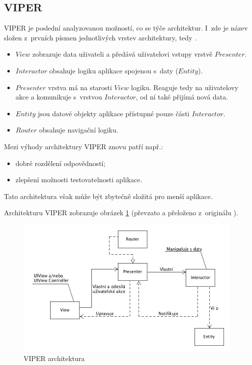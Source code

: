 \documentclass[thesis=M,czech]{FITthesis}[2012/06/26]
\begin{document}
\subsection{VIPER}
VIPER je poslední analyzovanou možností, co se týče architektur. I~zde je název složen z~prvních písmen jednotlivých vrstev architektury, tedy .
\begin{itemize}
\item $View$  zobrazuje data uživateli a předává uživatelovi vstupy vrstvě $Presenter$.
\item $Interactor$ obsahuje logiku aplikace spojenou s~daty ($Entity$).
\item $Presenter$ vrstva má na starosti $View$ logiku. Reaguje tedy na uživatelovy akce a komunikuje s~vrstvou $Interactor$, od ní také přijímá nová data. \cite{Orlov}
\item $Entity$ jsou datové objekty aplikace přístupné pouze části $Interactor$.
\item $Router$ obsahuje navigační logiku. \cite{VIPER}
\end{itemize}

Mezi výhody architektury VIPER znovu patří např.:
\begin{itemize}
\item dobré rozdělení odpovědností;
\item zlepšení možnosti testovatelnosti aplikace. \cite{Orlov}
\end{itemize}

Tato architektura však může být zbytečně složitá pro menší aplikace. \cite{Orlov}

Architekturu VIPER zobrazuje obrázek \ref{fig:viper} (převzato a přeloženo z~originálu \cite{viper-pic}).

\begin{figure}[h]\centering
 \includegraphics[width=0.99\textwidth]{./pictures/architektury/viper.png}
 \caption[VIPER architektura]{VIPER architektura}\label{fig:viper}
\end{figure}
\end{document}
